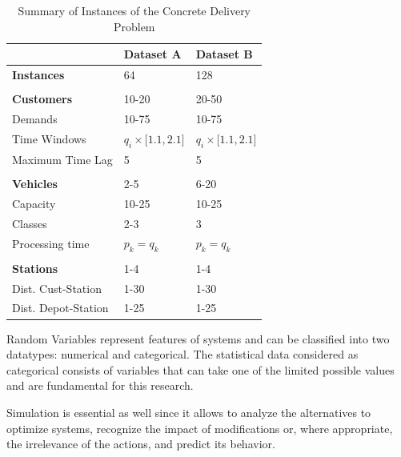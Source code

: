 \documentclass[5p,times]{elsarticle}
\begin{document}
	 \begin{table}[]
	 	\caption{Summary of Instances of the Concrete Delivery Problem}
	 	\label{tab:summary_instances}
	 	\begin{tabular}{@{}lll@{}}
	 		\toprule
	 		& \textbf{Dataset A}       & \textbf{Dataset B}       \\ \midrule
	 		\textbf{Instances}  & 64                       & 128                      \\
	 		&                          &                          \\
	 		\textbf{Customers}  & 10-20                    & 20-50                    \\
	 		Demands             & 10-75                    & 10-75                    \\
	 		Time Windows        & $ q_{i} \times {[1.1,2.1{]}}  $& $ q_{i} \times {[1.1,2.1{]}} $ \\
	 		Maximum Time Lag    & 5                        & 5                        \\
	 		&                          &                          \\
	 		\textbf{Vehicles}   & 2-5                      & 6-20                     \\
	 		Capacity            & 10-25                    & 10-25                    \\
	 		Classes             & 2-3                      & 3                        \\
	 		Processing time     & $ p_{k}=q_{k} $        & $ p_{k}=q_{k} $        \\
	 		&                          &                          \\
	 		\textbf{Stations}   & 1-4                      & 1-4                      \\
	 		Dist. Cust-Station  & 1-30                     & 1-30                     \\
	 		Dist. Depot-Station & 1-25                     & 1-25                     \\ \bottomrule
	 	\end{tabular}
	 \end{table}
	 
	 Random Variables represent features of systems and can be classified into two datatypes: numerical and categorical. The statistical data considered as categorical consists of variables that can take one of the limited possible values and are fundamental for this research.
	 
	 Simulation is essential as well since it allows to analyze the alternatives to optimize systems, recognize the impact of modifications or, where appropriate, the irrelevance of the actions, and predict its behavior.
	 
\end{document}
